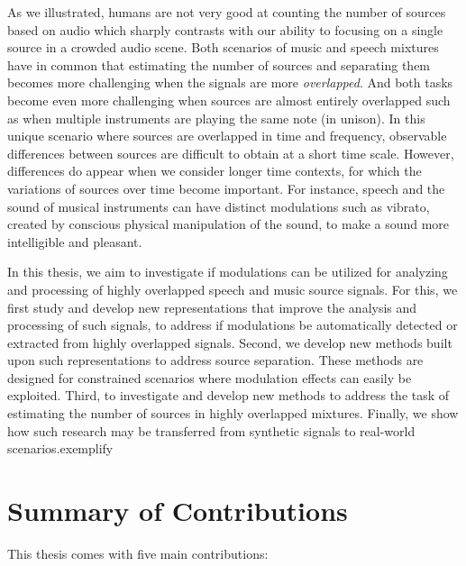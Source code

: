 As we illustrated, humans are not very good at counting the number of sources based on audio which sharply contrasts with our ability to focusing on a single source in a crowded audio scene.
Both scenarios of music and speech mixtures have in common that estimating the number of sources and separating them becomes more challenging when the signals are more \emph{overlapped}.
And both tasks become even more challenging when sources are almost entirely overlapped such as when multiple instruments are playing the same note (in unison).
In this unique scenario where sources are overlapped in time and frequency,
observable differences between sources are difficult to obtain at a short time scale.
However, differences do appear when we consider longer time contexts, for which the variations of sources over time become important.
For instance, speech and the sound of musical instruments can have distinct modulations such as vibrato, created by conscious physical manipulation of the sound, to make a sound more intelligible and pleasant.
\par
In this thesis, we aim to investigate if modulations can be utilized for analyzing and processing of highly overlapped speech and music source signals.
For this, we first study and develop new representations that improve the analysis and processing of such signals, to address if modulations be automatically detected or extracted from highly overlapped signals.
Second, we develop new methods built upon such representations to address source separation. 
These methods are designed for constrained scenarios where modulation effects can easily be exploited.
Third, to investigate and develop new methods to address the task of estimating the number of sources in highly overlapped mixtures.
Finally, we show how such research may be transferred from synthetic signals to real-world scenarios.exemplify

\section{Summary of Contributions}

This thesis comes with five main contributions:

